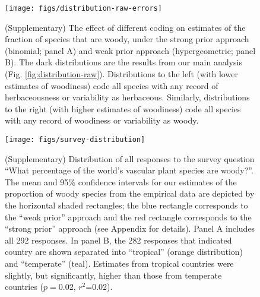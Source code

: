 \documentclass[a4paper,12pt]{article}
\begin{document}
\begin{figure}[p]
  \centering
  \texttt{[image: figs/distribution-raw-errors]}
  \caption{(Supplementary) The effect of different coding on estimates
    of the fraction of species that are woody, under the strong prior
    approach (binomial; panel A) and weak prior approach
    (hypergeometric; panel B).  The dark distributions are the results
    from our main analysis (Fig. \ref{fig:distribution-raw}).
    Distributions to the left (with lower estimates of woodiness) code
    all species with any record of herbaceousness or variability as
    herbaceous.  Similarly, distributions to the right (with higher
    estimates of woodiness) code all species with any record of
    woodiness or variability as woody.}
  \label{fig:distribution-raw-errors}
\end{figure}
    
      
\begin{figure}[p]
  \centering
  \texttt{[image: figs/survey-distribution]}
  \caption{(Supplementary) Distribution of all responses to the survey
    question ``What percentage of the world's vascular plant species
    are woody?''.
    The mean and 95\% confidence intervals for our estimates of the
    proportion of woody species from the empirical data are depicted
    by the horizontal shaded rectangles; the blue rectangle
    corresponds to the ``weak prior'' approach and the red rectangle
    corresponds to the ``strong prior'' approach (see Appendix for
    details).  
    Panel A includes all 292 responses.  In panel B, the 282
    responses that indicated country are shown separated into
    ``tropical'' (orange distribution) and ``temperate'' (teal).
    Estimates from tropical countries were slightly, but
    significantly, higher than those from temperate countries
    ($p=$0.02, $r^2$=0.02).
  }

  \label{fig:survey-distribution}
\end{figure}
\end{document}
